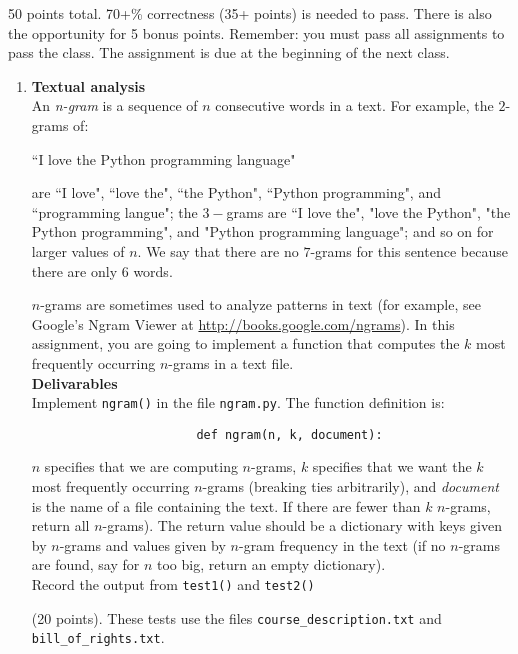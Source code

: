 \documentclass{article}
\newcounter{points}
\newcommand\setpoints[1]{\addtocounter{points}{#1}(#1 points)}
\begin{document}
\pagestyle{fancy}

50 points total.  70+\% correctness (35+ points) is needed to pass.  There is also the opportunity for 5 bonus points.  Remember: you must pass all assignments to pass the class.  The assignment is due at the beginning of the next class.

\begin{enumerate}
\item \textbf{Textual analysis} \\
An \emph{n-gram} is a sequence of $n$ consecutive words in a text.  For example, the $2$-grams of:
\begin{center}
 ``I love the Python programming language"
\end{center} are ``I love", ``love the", ``the Python", ``Python programming", and ``programming langue";  the $3-$grams are ``I love the", "love the Python", "the Python programming", and "Python programming language"; and so on for larger values of $n$.  We say that there are no $7$-grams for this sentence because there are only $6$ words.

$n$-grams are sometimes used to analyze patterns in text (for example, see Google's Ngram Viewer at \url{http://books.google.com/ngrams}).  In this assignment, you are going to implement a function that computes the $k$ most frequently occurring $n$-grams in a text file. \\

\textbf{Delivarables} \\
Implement \texttt{ngram()} in the file \texttt{ngram.py}.  The function definition is: \\

\begin{lstlisting}
                       def ngram(n, k, document):
\end{lstlisting}
$n$ specifies that we are computing $n$-grams, $k$ specifies that we want the $k$ most frequently occurring $n$-grams (breaking ties arbitrarily), and \emph{document} is the name of a file containing the text.  If there are fewer than $k$ $n$-grams, return all $n$-grams).  The return value should be a dictionary with keys given by $n$-grams and values given by $n$-gram frequency in the text  (if no $n$-grams are found, say for $n$ too big, return an empty dictionary).  \\

Record the output from \texttt{test1()} and \texttt{test2()} \setpoints{20}.  These tests use the files \texttt{course\_description.txt} and \texttt{bill\_of\_rights.txt}. \\


\end{enumerate}
\end{document}
